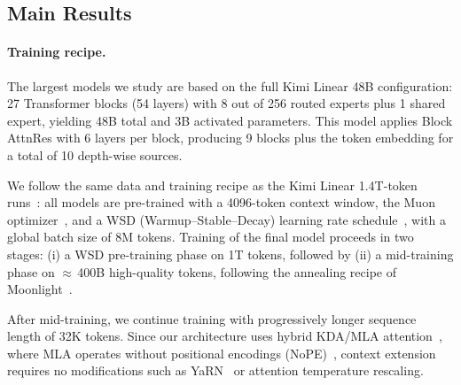 \subsection{Main Results}
\paragraph{Training recipe.}
The largest models we study are based on the full Kimi Linear 48B configuration: 27 Transformer blocks (54 layers) with 8 out of 256 routed experts plus 1 shared expert, yielding 48B total and 3B activated parameters.
This model applies Block AttnRes with 6 layers per block, producing 9 blocks plus the token embedding for a total of 10 depth-wise sources.

We follow the same data and training recipe as the Kimi Linear 1.4T-token runs~\citep{zhang2025kimi}: all models are pre-trained with a 4096-token context window, the Muon optimizer~\citep{liu-2025-moonlight}, and a WSD (Warmup--Stable--Decay) learning rate schedule~\citep{hu2024minicpm}, with a global batch size of 8M tokens. 
Training of the final model proceeds in two stages: (i) a WSD pre-training phase on 1T tokens, followed by (ii) a mid-training phase on ${\approx}\,$400B high-quality tokens, following the annealing recipe of Moonlight~\citep{liu-2025-moonlight}.

After mid-training, we continue training with progressively longer sequence length of 32K tokens. Since our architecture uses hybrid KDA/MLA attention~\citep{zhang2025kimi}, where MLA operates without positional encodings (NoPE)~\cite{yang2025ropenopeagainnew}, context extension requires no modifications such as YaRN~\citep{peng2023yarn} or attention temperature rescaling.

\label{sec:main}

